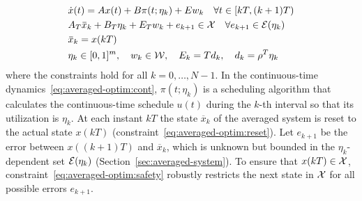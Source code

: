 \begin{subequations}
  \label{eq:averaged-optim}
  \begin{align}
    & \dot{x} (t) = Ax (t) + B \pi (t ; \eta_k) + Ew_{k} \quad \forall t \in [kT, (k + 1) T) %
\label{eq:averaged-optim:cont}\\
    & A_{T}  \overbar{x}_{k} + B_{T} \eta_k + E_{T} w_{k} + e_{k+1} \in \XSet \quad \forall e_{k+1} \in \ESet (\eta_{k}) \label{eq:averaged-optim:safety}\\
    & \overbar{x}_{k} = x (kT) \label{eq:averaged-optim:reset}\\
    & \eta_{k} \in [0,1]^{m}, \quad w_{k} \in \WSet, \quad E_k = Td_k, \quad d_k = \rho^T \eta_k
  \end{align}
\end{subequations}
where the constraints hold for all $k = 0, \ldots, N - 1$.
In the continuous-time dynamics~\eqref{eq:averaged-optim:cont}, $\pi (t ; \eta_k)$ is a scheduling algorithm that calculates the continuous-time schedule $u (t)$ during the $k$-th interval so that
its utilization is $\eta_k$.
At each instant $kT$ the state $\overbar{x}_{k}$ of the averaged system is reset to the actual state $x (kT)$ (constraint~\eqref{eq:averaged-optim:reset}).
Let $e_{k+1}$ be the error between $x((k+1)T)$ and $\overbar{x}_{k}$, which is unknown but bounded in the $\eta_k$-dependent set $\mathcal{E}(\eta_{k})$ (\cf Section~\ref{sec:averaged-system}).
To ensure that $x (k T) \in \mathcal{X}$, constraint~\eqref{eq:averaged-optim:safety} robustly restricts the next state in $\mathcal{X}$ for all possible errors $e_{k+1}$.

